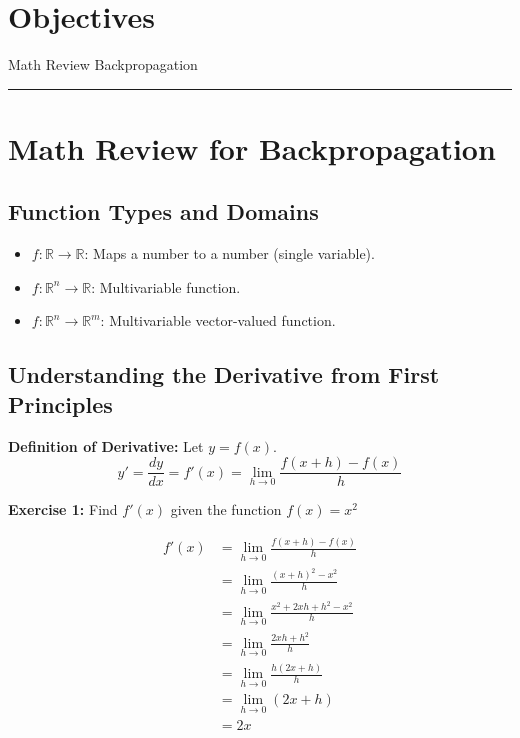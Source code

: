 \section*{Objectives}

\begin{outline}
    \1 Math Review
    \1 Backpropagation 
\end{outline}

\rule[0.0051in]{\textwidth}{0.00025in}

\section{Math Review for Backpropagation}

\subsection{Function Types and Domains}

\begin{itemize}
    \item $f: \mathbb{R} \to \mathbb{R}$: Maps a number to a number (single variable).
    \item $f: \mathbb{R}^n \to \mathbb{R}$: Multivariable function.
    \item $f: \mathbb{R}^n \to \mathbb{R}^m$: Multivariable vector-valued function.
\end{itemize}

\subsection{Understanding the Derivative from First Principles}

\textbf{Definition of Derivative:} Let $y = f(x)$.
\[
y' = \frac{dy}{dx} = f'(x) = \lim_{h \to 0} \frac{f(x+h) - f(x)}{h}
\]

\textbf{Exercise 1:} Find \( f'(x) \) given the function \( f(x) = x^2 \)

\begin{align*}
f'(x) &= \lim_{h \to 0} \frac{f(x+h) - f(x)}{h} \\
      &= \lim_{h \to 0} \frac{(x+h)^2 - x^2}{h} \\
      &= \lim_{h \to 0} \frac{x^2 + 2xh + h^2 - x^2}{h} \\
      &= \lim_{h \to 0} \frac{2xh + h^2}{h} \\
      &= \lim_{h \to 0} \frac{h(2x + h)}{h} \\
      &= \lim_{h \to 0} (2x + h) \\
      &= 2x
\end{align*}

